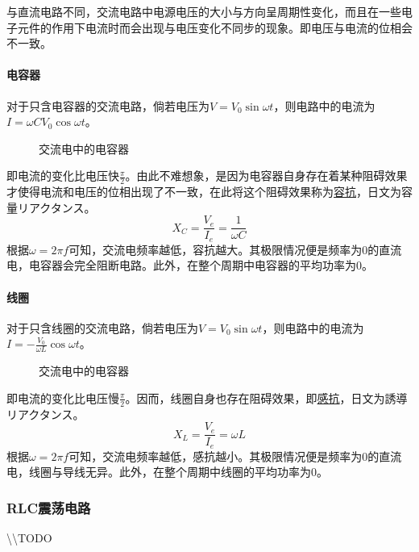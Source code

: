 与直流电路不同，交流电路中电源电压的大小与方向呈周期性变化，而且在一些电子元件的作用下电流时而会出现与电压变化不同步的现象。即电压与电流的位相会不一致。

\paragraph{电容器} 对于只含电容器的交流电路，倘若电压为$V=V_0\sin\omega t$，则电路中的电流为$I=\omega CV_0\cos\omega t$。
\begin{figure}[ht!]
    \centering
    \caption{交流电中的电容器}
\end{figure}
即电流的变化比电压快$\frac\pi2$。由此不难想象，是因为电容器自身存在着某种阻碍效果才使得电流和电压的位相出现了不一致，在此将这个阻碍效果称为\underline{容抗}，日文为容量リアクタンス。
\begin{equation*}
    X_C=\frac{V_e}{I_e}=\frac{1}{\omega C}
\end{equation*}
根据$\omega=2\pi f$可知，交流电频率越低，容抗越大。其极限情况便是频率为0的直流电，电容器会完全阻断电路。此外，在整个周期中电容器的平均功率为0。

\paragraph{线圈} 对于只含线圈的交流电路，倘若电压为$V=V_0\sin\omega t$，则电路中的电流为$I=-\frac{V_0}{\omega L}\cos\omega t$。
\begin{figure}[ht!]
    \centering
    \caption{交流电中的电容器}
\end{figure}
即电流的变化比电压慢$\frac\pi2$。因而，线圈自身也存在阻碍效果，即\underline{感抗}，日文为誘導リアクタンス。
\begin{equation*}
    X_L=\frac{V_e}{I_e}=\omega L
\end{equation*}
根据$\omega=2\pi f$可知，交流电频率越低，感抗越小。其极限情况便是频率为0的直流电，线圈与导线无异。此外，在整个周期中线圈的平均功率为0。

\subsubsection{RLC震荡电路}

\textbackslash\textbackslash TODO
